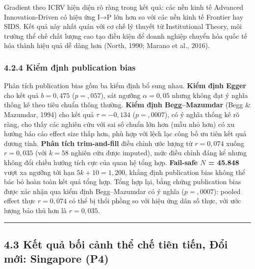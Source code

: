 \documentclass[12pt,a4paper]{article}
\begin{document}
Gradient theo ICRV hiện diện rõ ràng trong kết quả: các nền kinh tế
Advanced Innovation-Driven có hiệu ứng I→P lớn hơn so với các nền kinh
tế Frontier hay SIDS. Kết quả này nhất quán với cơ chế lý thuyết từ
Institutional Theory, môi trường thể chế chất lượng cao tạo điều kiện để
doanh nghiệp chuyển hóa quốc tế hóa thành hiệu quả dễ dàng hơn (North,
1990; Marano et al., 2016).

\hypertarget{424-kiux1ec3m-ux111ux1ecbnh-publication-bias}{%
\subsubsection{4.2.4 Kiểm định publication
bias}\label{424-kiux1ec3m-ux111ux1ecbnh-publication-bias}}

Phân tích publication bias gồm ba kiểm định bổ sung nhau. \textbf{Kiểm
định Egger} cho kết quả \(b = 0{,}475\) (\(p = {,}057\)), sát ngưỡng
\(\alpha = 0{,}05\) nhưng không đạt ý nghĩa thống kê theo tiêu chuẩn
thông thường. \textbf{Kiểm định Begg--Mazumdar} (Begg \& Mazumdar, 1994)
cho kết quả \(\tau = -0{,}134\) (\(p = {,}0007\)), có ý nghĩa thống kê
rõ ràng, cho thấy các nghiên cứu với sai số chuẩn lớn hơn (mẫu nhỏ hơn)
có xu hướng báo cáo effect size thấp hơn, phù hợp với lệch lạc công bố
ưu tiên kết quả dương tính. \textbf{Phân tích trim-and-fill} điều chỉnh
ước lượng từ \(r = 0{,}074\) xuống \(r = 0{,}035\) (với \(k = 58\)
nghiên cứu được imputed), mức điều chỉnh đáng kể nhưng không đổi chiều
hướng tích cực của quan hệ tổng hợp. \textbf{Fail-safe \(N\) = 45.848}
vượt xa ngưỡng tới hạn \(5k + 10 = 1{,}200\), khẳng định publication
bias không thể bác bỏ hoàn toàn kết quả tổng hợp. Tổng hợp lại, bằng
chứng publication bias được xác nhận qua kiểm định Begg--Mazumdar có ý
nghĩa (\(p = {,}0007\)): pooled effect thực \(r = 0{,}074\) có thể bị
thổi phồng so với hiệu ứng dân số thực, với ước lượng bảo thủ hơn là
\(r = 0{,}035\).

\begin{center}\rule{0.5\linewidth}{0.5pt}\end{center}

\hypertarget{43-kux1ebft-quux1ea3-bux1ed1i-cux1ea3nh-thux1ec3-chux1ebf-tiuxean-tiux1ebfn-ux111ux1ed5i-mux1edbi-singapore-p4}{%
\subsection{4.3 Kết quả bối cảnh thể chế tiên tiến, Đổi mới: Singapore
(P4)}\label{43-kux1ebft-quux1ea3-bux1ed1i-cux1ea3nh-thux1ec3-chux1ebf-tiuxean-tiux1ebfn-ux111ux1ed5i-mux1edbi-singapore-p4}}
\end{document}
